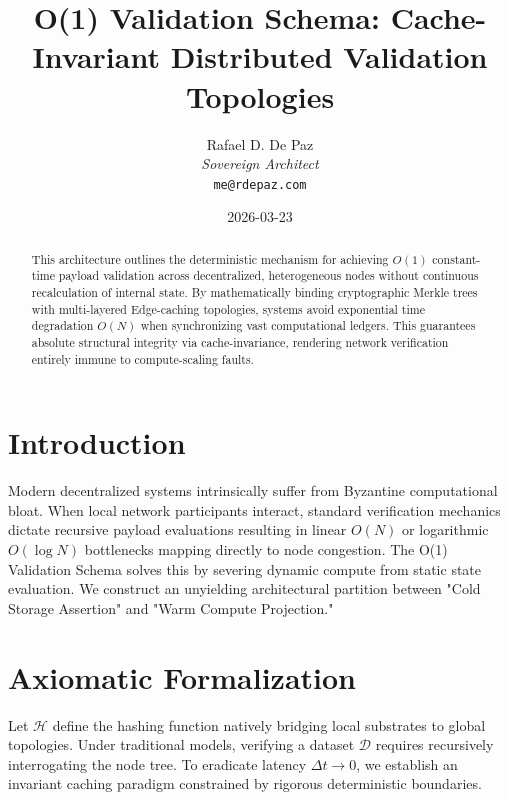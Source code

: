 \documentclass[12pt, a4paper]{article}
\theoremstyle{plain}
\theoremstyle{definition}
\begin{document}
\title{\textbf{O(1) Validation Schema: Cache-Invariant Distributed Validation Topologies}}
\author{Rafael D. De Paz \\ \textit{Sovereign Architect} \\ \texttt{me@rdepaz.com}}
\date{2026-03-23}
\maketitle

\begin{abstract}
This architecture outlines the deterministic mechanism for achieving $O(1)$ constant-time payload validation across decentralized, heterogeneous nodes without continuous recalculation of internal state. By mathematically binding cryptographic Merkle trees with multi-layered Edge-caching topologies, systems avoid exponential time degradation $O(N)$ when synchronizing vast computational ledgers. This guarantees absolute structural integrity via cache-invariance, rendering network verification entirely immune to compute-scaling faults.
\end{abstract}

\section{Introduction}
Modern decentralized systems intrinsically suffer from Byzantine computational bloat. When local network participants interact, standard verification mechanics dictate recursive payload evaluations resulting in linear $O(N)$ or logarithmic $O(\log N)$ bottlenecks mapping directly to node congestion. The O(1) Validation Schema solves this by severing dynamic compute from static state evaluation. We construct an unyielding architectural partition between "Cold Storage Assertion" and "Warm Compute Projection."

\section{Axiomatic Formalization}
Let $\mathcal{H}$ define the hashing function natively bridging local substrates to global topologies. Under traditional models, verifying a dataset $\mathcal{D}$ requires recursively interrogating the node tree. To eradicate latency $\Delta t \to 0$, we establish an invariant caching paradigm constrained by rigorous deterministic boundaries.
\end{document}
